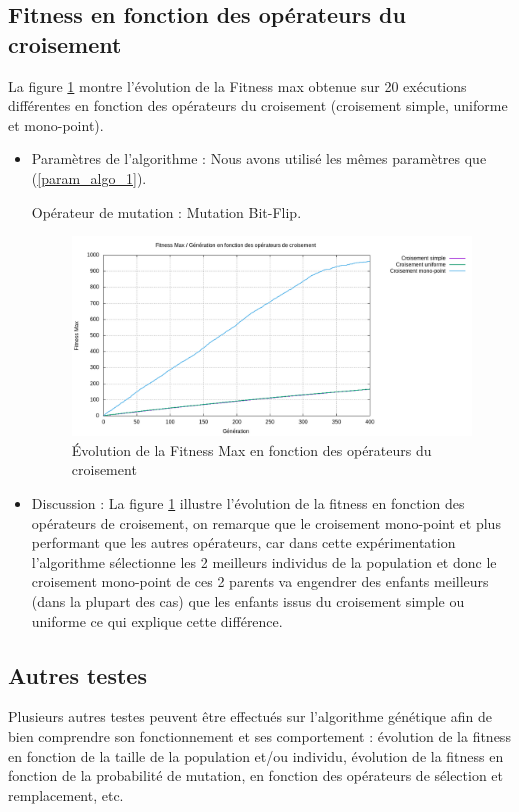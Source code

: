 \documentclass[12pt]{article}
\begin{document}
\subsection{Fitness en fonction des opérateurs du croisement } La figure \ref{fitness_op_crois} montre l'évolution de la Fitness max obtenue sur 20 exécutions différentes en fonction des opérateurs du croisement (croisement simple, uniforme et mono-point).
\begin{itemize}
\item{Paramètres de l'algorithme : }  Nous avons utilisé les mêmes paramètres que (\ref{param_algo_1}). 
	\begin{itemize}
	Opérateur de mutation : Mutation Bit-Flip.
	\end{itemize}  
 
\begin{figure}[H]
		\begin{center}
			\includegraphics[scale=0.5]{img/fitness_op_crois.png}
			\caption{Évolution de la Fitness Max en fonction des opérateurs du croisement}
			\label{fitness_op_crois}
		\end{center}
\end{figure} 

\item{Discussion : } La figure \ref{fitness_op_crois} illustre l'évolution de la fitness en fonction des opérateurs de croisement, on remarque que le croisement mono-point et plus performant que les autres opérateurs, car dans cette expérimentation l'algorithme sélectionne les 2 meilleurs individus de la population et donc le croisement mono-point de ces 2 parents va engendrer des enfants meilleurs (dans la plupart des cas) que les enfants issus du croisement simple ou uniforme ce qui explique cette différence.
 
\end{itemize}

\subsection{Autres testes}
Plusieurs autres testes peuvent être effectués sur l'algorithme génétique afin de bien comprendre son fonctionnement et ses comportement : évolution de la fitness en fonction de la taille de la population et/ou individu, évolution de la fitness en fonction de la probabilité de mutation, en fonction des opérateurs de sélection et remplacement, etc.\\
\end{document}
